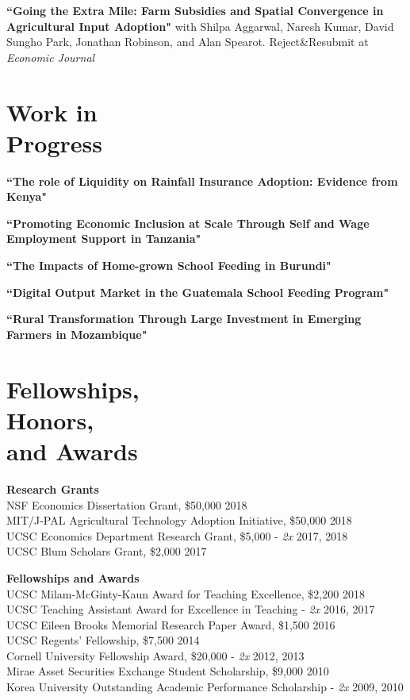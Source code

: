 \documentclass[letterpaper, margin, 10pt]{res} %
\begin{document}
\begin{resume}
{\bf ``Going the Extra Mile: Farm Subsidies and Spatial Convergence in Agricultural Input Adoption"}
with Shilpa Aggarwal, Naresh Kumar, David Sungho Park, Jonathan Robinson, and Alan Spearot. Reject\&Resubmit at \textit{Economic Journal}


\normalsize\section{\textbf{Work in  \\ Progress}}

{\bf ``The role of Liquidity on Rainfall Insurance Adoption: Evidence from Kenya"}

{\bf ``Promoting Economic Inclusion at Scale Through Self and Wage Employment Support in Tanzania"}

{\bf ``The Impacts of Home-grown School Feeding in Burundi"}

{\bf ``Digital Output Market in the Guatemala School Feeding Program"}

{\bf ``Rural Transformation Through Large Investment in Emerging Farmers in Mozambique"}



\section{\sc \textbf{Fellowships, \\ Honors, \\ and Awards}}
{\bf Research Grants}\\
NSF Economics Dissertation Grant, \$50,000  \hfill{2018}\\
MIT/J-PAL Agricultural Technology Adoption Initiative, \$50,000   \hfill{2018}\\
UCSC Economics Department Research Grant, \$5,000 - \textit{2x}  \hfill{2017, 2018}\\
UCSC Blum Scholars Grant, \$2,000    \hfill{2017}

{\bf Fellowships and Awards}\\
UCSC Milam-McGinty-Kaun Award for Teaching Excellence, \$2,200  \hfill{2018}\\
UCSC Teaching Assistant Award for Excellence in Teaching -  \textit{2x}   \hfill{2016, 2017}\\
UCSC Eileen Brooks Memorial Research Paper Award, \$1,500  \hfill{2016}\\
UCSC Regents' Fellowship, \$7,500 \hfill{2014}\\
Cornell University Fellowship Award, \$20,000 -  \textit{2x} \hfill{2012, 2013}\\
Mirae Asset Securities Exchange Student Scholarship, \$9,000 \hfill{2010}\\
Korea University Outstanding Academic Performance Scholarship -  \textit{2x} \hfill{2009, 2010}



\end{resume}
\end{document}
